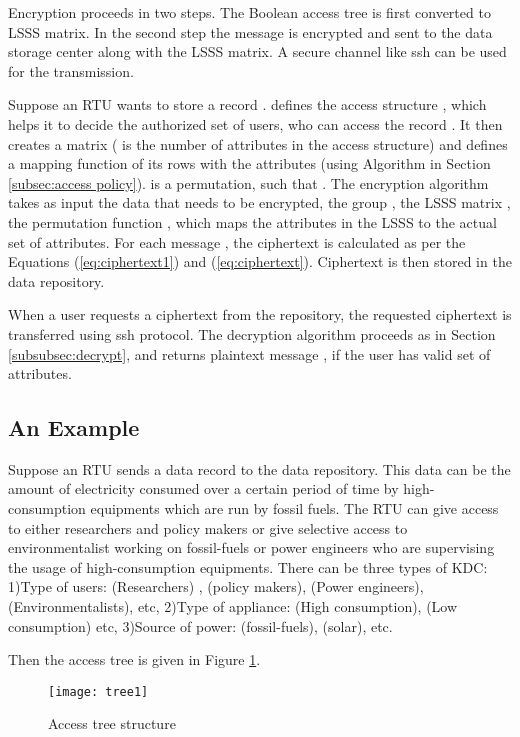 \documentclass[conference]{IEEEtran}[10pt]
\begin{document}
Encryption proceeds in two steps. The Boolean access tree is first converted to LSSS matrix. 
In the second step the message is encrypted and sent to the data storage center along with the LSSS matrix. 
A secure channel like ssh can be used for the transmission. 

Suppose an RTU  wants to store a record . 
 defines the access structure , 
which helps it to decide the authorized set of users, who can access the record . 
It then creates a  matrix  ( is the number of attributes in the access structure) and defines a mapping function 
 of its rows with the attributes (using Algorithm in Section \ref{subsec:access policy}). 
  is a permutation, such that . 
The encryption algorithm takes as input the data   that needs to be encrypted, the group , the LSSS matrix , the permutation function , 
which maps the attributes in the LSSS to the actual set of attributes. 
For each message , the ciphertext  is calculated as per the Equations (\ref{eq:ciphertext1}) and (\ref{eq:ciphertext}). 
Ciphertext  is then stored in the data repository. 

When a user  requests a ciphertext from the repository, 
the requested ciphertext  is transferred using ssh protocol. 
The decryption algorithm proceeds as in Section \ref{subsubsec:decrypt}, and returns plaintext message , if the user has valid set of attributes.  


\subsection{An Example}
\label{subsec:example}
Suppose an RTU sends a data record to the data repository. 
This data can be the amount of electricity consumed over a certain period of time by high-consumption equipments which are run by fossil fuels. 
The RTU can give access to either researchers and policy makers or give selective access to environmentalist working on fossil-fuels
or power engineers who are supervising the usage of high-consumption equipments. 
There can be three types of KDC:
1)Type of users:  (Researchers) ,  (policy makers),  (Power engineers),  (Environmentalists), etc,
2)Type of appliance:  (High consumption),  (Low consumption) etc,  
3)Source of power:  (fossil-fuels),  (solar), etc. 

Then the access tree is given in Figure \ref{fig:tree}. 
\begin{figure}[htb]
\begin{centering}
\texttt{[image: tree1]}
\caption{
Access tree structure
}
\label{fig:tree}
\end{centering}
\end{figure}
\end{document}
